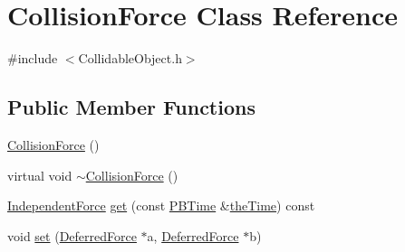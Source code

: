 \hypertarget{class_collision_force}{\section{Collision\-Force Class Reference}
\label{class_collision_force}
}


{\ttfamily \#include $<$Collidable\-Object.\-h$>$}

\subsection*{Public Member Functions}
\begin{DoxyCompactItemize}
\item 
\hyperlink{class_collision_force_a3781a639cf9229971db982facaa16e4f}{Collision\-Force} ()
\item 
virtual void \hyperlink{class_collision_force_a94c4bb70d3d19b58aab28ca717614582}{$\sim$\-Collision\-Force} ()
\item 
\hyperlink{class_independent_force}{Independent\-Force} \hyperlink{class_collision_force_a21e2c74bc0e6be829df48d1b036d20c6}{get} (const \hyperlink{class_p_b_time}{P\-B\-Time} \&\hyperlink{_physically_based_8h_a766da334af281a8fa1ed5cf404d0ec45}{the\-Time}) const 
\item 
void \hyperlink{class_collision_force_af4381b3c21af2d0c34042c55b211e061}{set} (\hyperlink{class_deferred_force}{Deferred\-Force} $\ast$a, \hyperlink{class_deferred_force}{Deferred\-Force} $\ast$b)
\end{DoxyCompactItemize}


